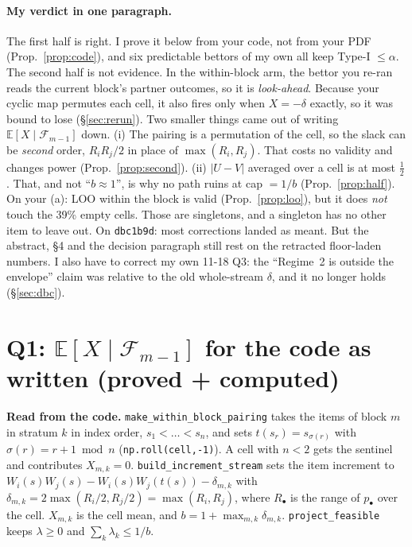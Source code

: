 \documentclass[11pt]{article}
\newcommand{\E}{\mathbb{E}}
\newcommand{\Fc}{\mathcal{F}}
\begin{document}
\paragraph{My verdict in one paragraph.} The first half is right. I prove it below from your code, not from your PDF (Prop.~\ref{prop:code}), and six predictable bettors of my own all keep Type-I $\le\alpha$. The second half is not evidence. In the within-block arm, the bettor you re-ran reads the current block's partner outcomes, so it is \emph{look-ahead}. Because your cyclic map permutes each cell, it also fires only when $X=-\delta$ exactly, so it was bound to lose (\S\ref{sec:rerun}). Two smaller things came out of writing $\E[X\mid\Fc_{m-1}]$ down.
(i) The pairing is a permutation of the cell, so the slack can be \emph{second} order, $R_iR_j/2$ in place of $\max(R_i,R_j)$. That costs no validity and changes power (Prop.~\ref{prop:second}).
(ii) $|U-V|$ averaged over a cell is at most $\tfrac12$. That, and not ``$b\approx1$'', is why no path ruins at cap $=1/b$ (Prop.~\ref{prop:half}).
On your (a): LOO within the block is valid (Prop.~\ref{prop:loo}), but it does \emph{not} touch the 39\% empty cells. Those are singletons, and a singleton has no other item to leave out.
On \texttt{dbc1b9d}: most corrections landed as meant. But the abstract, \S4 and the decision paragraph still rest on the retracted floor-laden numbers. I also have to correct my own 11-18 Q3: the ``Regime~2 is outside the envelope'' claim was relative to the old whole-stream $\delta$, and it no longer holds (\S\ref{sec:dbc}).

\section{Q1: $\E[X\mid\Fc_{m-1}]$ for the code as written (proved + computed)}\label{sec:q1}
\textbf{Read from the code.} \texttt{make\_within\_block\_pairing} takes the items of block $m$ in stratum $k$ in index order, $s_1<\dots<s_n$, and sets $t(s_r)=s_{\sigma(r)}$ with $\sigma(r)=r+1\bmod n$ (\texttt{np.roll(cell,-1)}). A cell with $n<2$ gets the sentinel and contributes $X_{m,k}=0$.
\texttt{build\_increment\_stream} sets the item increment to $W_i(s)W_j(s)-W_i(s)W_j(t(s))-\delta_{m,k}$ with $\delta_{m,k}=2\max(R_i/2,R_j/2)=\max(R_i,R_j)$, where $R_\bullet$ is the range of $p_\bullet$ over the cell. $X_{m,k}$ is the cell mean, and $b=1+\max_{m,k}\delta_{m,k}$.
\texttt{project\_feasible} keeps $\lambda\ge0$ and $\sum_k\lambda_k\le1/b$.
\end{document}
